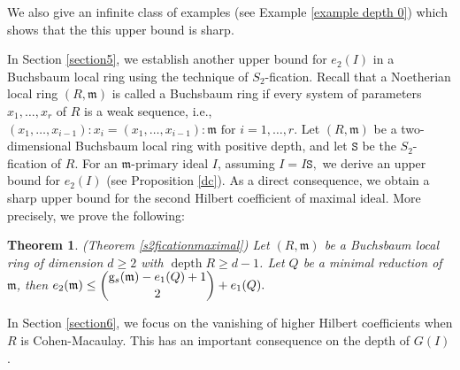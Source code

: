 \documentclass[reqno,a4paper,dvipsnames]{amsart}
\newcommand{\m}{\mathfrak{m} }
\newcommand{\depth}{\operatorname{depth}}
\newtheorem{theorem}{Theorem}[section]
\theoremstyle{definition}
\begin{document}
We also give an  infinite class of examples (see Example \ref{example depth 0}) which shows that the  this upper bound is sharp. 

In Section \ref{section5},  we establish another upper bound for $e_{2}(I)$ in a Buchsbaum local ring using the technique of $S_{2}$-fication.
Recall that a Noetherian local ring $(R, \m)$ is called a Buchsbaum ring if every system of parameters $x_{1},\ldots,x_{r}$ of $R$ is a weak sequence, i.e., 
     $(x_{1},\ldots,x_{i-1}):x_{i}=(x_{1},\ldots,x_{i-1}):\m \text{ for } i=1,\ldots, r.$
     Let $(R,\m)$ be a two-dimensional Buchsbaum local ring with positive depth,  and let $\mathtt{S}$ be  the $S_{2}$-fication of $R.$ For an $\m$-primary ideal $I$, assuming $I=I\mathtt{S},$ we derive an upper bound for $e_{2}(I)$ (see Proposition \ref{dc}). As a direct consequence,  we obtain a sharp upper bound for the second Hilbert coefficient of maximal ideal. More precisely, we prove the following:
\begin{theorem} (Theorem \ref{s2ficationmaximal})
  Let $(R,\m)$ be a Buchsbaum local ring of dimension $d \geq 2$ with $\depth R\geq d-1$. Let $Q$ be a minimal reduction of $\m$, then   $e_{2}(\m) \leq \dbinom{\mathrm{g}_{s}(\m)-e_{1}(Q)+1}{2}+e_{1}(Q).$
\end{theorem}

In Section \ref{section6}, we focus on the vanishing of  higher Hilbert coefficients  when $R$ is Cohen-Macaulay.  This has an important  consequence on the depth of $G(I)$. 
  
\end{document}
